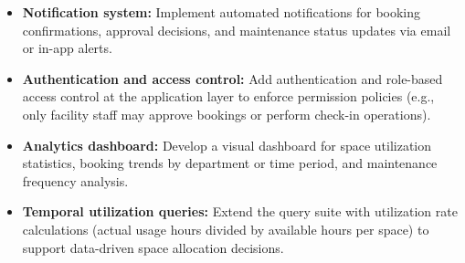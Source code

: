 \begin{itemize}
    \item \textbf{Notification system:} Implement automated notifications for booking confirmations, approval decisions, and maintenance status updates via email or in-app alerts.

    \item \textbf{Authentication and access control:} Add authentication and role-based access control at the application layer to enforce permission policies (e.g., only facility staff may approve bookings or perform check-in operations).

    \item \textbf{Analytics dashboard:} Develop a visual dashboard for space utilization statistics, booking trends by department or time period, and maintenance frequency analysis.

    \item \textbf{Temporal utilization queries:} Extend the query suite with utilization rate calculations (actual usage hours divided by available hours per space) to support data-driven space allocation decisions.
\end{itemize}
